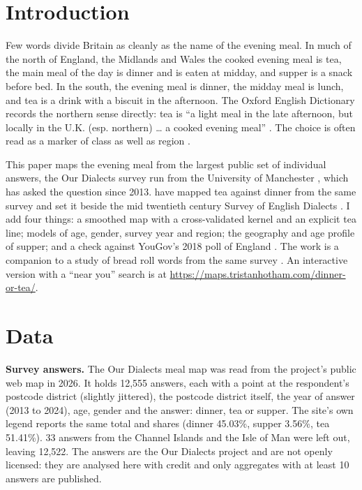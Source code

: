 \documentclass[11pt,a4paper]{article}
\begin{document}
\section{Introduction}
Few words divide Britain as cleanly as the name of the evening meal. In much of the north of England, the Midlands and Wales the cooked evening meal is tea, the main meal of the day is dinner and is eaten at midday, and supper is a snack before bed. In the south, the evening meal is dinner, the midday meal is lunch, and tea is a drink with a biscuit in the afternoon. The Oxford English Dictionary records the northern sense directly: tea is ``a light meal in the late afternoon, but locally in the U.K. (esp. northern) \ldots{} a cooked evening meal'' \citep{oed}. The choice is often read as a marker of class as well as region \citep{fox}.

This paper maps the evening meal from the largest public set of individual answers, the Our Dialects survey run from the University of Manchester \citep{ourdialects}, which has asked the question since 2013. \citet{mackenzie} have mapped tea against dinner from the same survey and set it beside the mid twentieth century Survey of English Dialects \citep{sed}. I add four things: a smoothed map with a cross-validated kernel and an explicit tea line; models of age, gender, survey year and region; the geography and age profile of supper; and a check against YouGov's 2018 poll of England \citep{yougov}. The work is a companion to a study of bread roll words from the same survey \citep{rolls}. An interactive version with a ``near you'' search is at \url{https://maps.tristanhotham.com/dinner-or-tea/}.

\section{Data}
\textbf{Survey answers.} The Our Dialects meal map was read from the project's public web map in 2026. It holds 12,555 answers, each with a point at the respondent's postcode district (slightly jittered), the postcode district itself, the year of answer (2013 to 2024), age, gender and the answer: dinner, tea or supper. The site's own legend reports the same total and shares (dinner 45.03\%, supper 3.56\%, tea 51.41\%). 33 answers from the Channel Islands and the Isle of Man were left out, leaving 12,522. The answers are \textcopyright{} the Our Dialects project and are not openly licensed: they are analysed here with credit and only aggregates with at least 10 answers are published.
\end{document}
